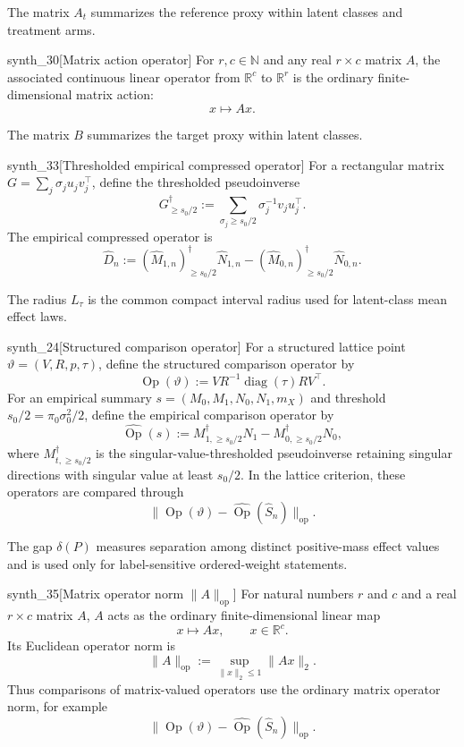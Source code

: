 \documentclass[11pt]{article}
\begin{document}
The matrix \(A_t\) summarizes the reference proxy within latent classes and treatment arms.

\begin{definitionv}{synth_30}[Matrix action operator]
For \(r,c\in\mathbb N\) and any real \(r\times c\) matrix \(A\), the associated continuous linear operator from \(\mathbb R^c\) to \(\mathbb R^r\) is the ordinary finite-dimensional matrix action:
\[
x\longmapsto Ax .
\]
\end{definitionv}

The matrix \(B\) summarizes the target proxy within latent classes.

\begin{definitionv}{synth_33}[Thresholded empirical compressed operator]
For a rectangular matrix \(G=\sum_j\sigma_j u_jv_j^\top\), define the thresholded pseudoinverse \[G^\dagger_{\ge s_0/2}:=\sum_{\sigma_j\ge s_0/2}\sigma_j^{-1}v_ju_j^\top.\] The empirical compressed operator is \[\widehat D_n:=(\widehat M_{1,n})^\dagger_{\ge s_0/2}\widehat N_{1,n}-(\widehat M_{0,n})^\dagger_{\ge s_0/2}\widehat N_{0,n}.\]
\end{definitionv}

The radius \(L_{\tau}\) is the common compact interval radius used for latent-class mean effect laws.

\begin{definitionv}{synth_24}[Structured comparison operator]
For a structured lattice point \(\vartheta=(V,R,p,\tau)\), define the structured comparison operator by
\[
\operatorname{Op}(\vartheta):=VR^{-1}\operatorname{diag}(\tau)RV^\top .
\]
For an empirical summary \(s=(M_0,M_1,N_0,N_1,m_X)\) and threshold \(s_0/2=\pi_0\sigma_0^2/2\), define the empirical comparison operator by
\[
\widehat{\operatorname{Op}}(s):=M_{1,\ge s_0/2}^{\dagger}N_1-M_{0,\ge s_0/2}^{\dagger}N_0,
\]
where \(M_{t,\ge s_0/2}^{\dagger}\) is the singular-value-thresholded pseudoinverse retaining singular directions with singular value at least \(s_0/2\). In the lattice criterion, these operators are compared through
\[
\|\operatorname{Op}(\vartheta)-\widehat{\operatorname{Op}}(\widehat S_n)\|_{\mathrm{op}}.
\]
\end{definitionv}

The gap \(\delta(P)\) measures separation among distinct positive-mass effect values and is used only for label-sensitive ordered-weight statements.

\begin{definitionv}{synth_35}[Matrix operator norm \(\|A\|_{\mathrm{op}}\)]
For natural numbers \(r\) and \(c\) and a real \(r\times c\) matrix \(A\), \(A\) acts as the ordinary finite-dimensional linear map
\[
x\mapsto Ax,
\qquad x\in\mathbb R^c.
\]
Its Euclidean operator norm is
\[
\|A\|_{\mathrm{op}}:=\sup_{\|x\|_2\le 1}\|Ax\|_2.
\]
Thus comparisons of matrix-valued operators use the ordinary matrix operator norm, for example
\[
\|\operatorname{Op}(\vartheta)-\widehat{\operatorname{Op}}(\widehat S_n)\|_{\mathrm{op}}.
\]
\end{definitionv}
\end{document}
